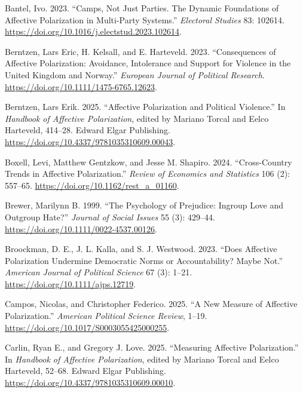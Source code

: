 \documentclass[
  12pt,
  a4paper,
  DIV=11,
  numbers=noendperiod]{scrartcl}
\newlength{\cslhangindent}
\newenvironment{CSLReferences}[2] %
 {\begin{list}{}{%
  \setlength{\itemindent}{0pt}
  \setlength{\leftmargin}{0pt}
  \setlength{\parsep}{0pt}
  \ifodd #1
   \setlength{\leftmargin}{\cslhangindent}
   \setlength{\itemindent}{-1\cslhangindent}
  \fi
  \setlength{\itemsep}{#2\baselineskip}}}
 {\end{list}}
\begin{document}
\begin{CSLReferences}{1}{0}
Bantel, Ivo. 2023. {``Camps, Not Just Parties. The Dynamic Foundations
of Affective Polarization in Multi-Party Systems.''} \emph{Electoral
Studies} 83: 102614.
\url{https://doi.org/10.1016/j.electstud.2023.102614}.

Berntzen, Lars Eric, H. Kelsall, and E. Harteveld. 2023. {``Consequences
of Affective Polarization: Avoidance, Intolerance and Support for
Violence in the United Kingdom and Norway.''} \emph{European Journal of
Political Research}. \url{https://doi.org/10.1111/1475-6765.12623}.

Berntzen, Lars Erik. 2025. {``Affective Polarization and Political
Violence.''} In \emph{Handbook of Affective Polarization}, edited by
Mariano Torcal and Eelco Harteveld, 414--28. Edward Elgar Publishing.
\url{https://doi.org/10.4337/9781035310609.00043}.

Boxell, Levi, Matthew Gentzkow, and Jesse M. Shapiro. 2024.
{``Cross-Country Trends in Affective Polarization.''} \emph{Review of
Economics and Statistics} 106 (2): 557--65.
\url{https://doi.org/10.1162/rest_a_01160}.

Brewer, Marilynn B. 1999. {``The Psychology of Prejudice: Ingroup Love
and Outgroup Hate?''} \emph{Journal of Social Issues} 55 (3): 429--44.
\url{https://doi.org/10.1111/0022-4537.00126}.

Broockman, D. E., J. L. Kalla, and S. J. Westwood. 2023. {``Does
Affective Polarization Undermine Democratic Norms or Accountability?
Maybe Not.''} \emph{American Journal of Political Science} 67 (3):
1--21. \url{https://doi.org/10.1111/ajps.12719}.

Campos, Nicolas, and Christopher Federico. 2025. {``A New Measure of
Affective Polarization.''} \emph{American Political Science Review},
1--19. \url{https://doi.org/10.1017/S0003055425000255}.

Carlin, Ryan E., and Gregory J. Love. 2025. {``Measuring Affective
Polarization.''} In \emph{Handbook of Affective Polarization}, edited by
Mariano Torcal and Eelco Harteveld, 52--68. Edward Elgar Publishing.
\url{https://doi.org/10.4337/9781035310609.00010}.


\end{CSLReferences}
\end{document}
